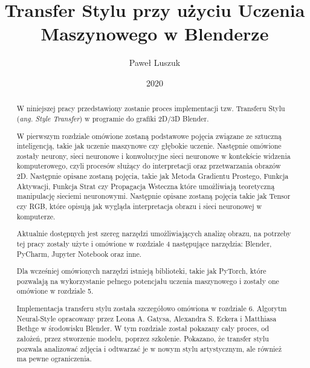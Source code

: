 \documentclass[openright]{xmgr}
\author   {Paweł Luszuk}
\title    {Transfer Stylu przy użyciu Uczenia Maszynowego w Blenderze}
\date     {2020}
\begin{document}
\begin{abstract}

\indent \indent W niniejszej pracy przedstawiony zostanie proces implementacji tzw. Transferu Stylu (\textit{ang. Style Transfer}) w programie do grafiki 2D/3D Blender.

W pierwszym rozdziale omówione zostaną podstawowe pojęcia związane ze sztuczną inteligencją,  takie jak uczenie maszynowe czy głębokie uczenie.  Następnie omówione zostały neurony,  sieci neuronowe i konwolucyjne sieci neuronowe w kontekście widzenia komputerowego,  czyli procesów służący do interpretacji oraz przetwarzania obrazów 2D.  Następnie opisane zostaną pojęcia,  takie jak Metoda Gradientu Prostego,  Funkcja Aktywacji,  Funkcja Strat czy Propagacja Wsteczna które umożliwiają teoretyczną manipulację sieciemi neuronowymi.  Następnie opisane zostaną pojęcia takie jak Tensor czy RGB,  które opisują jak wygląda interpretacja obrazu i sieci neuronowej w komputerze.


Aktualnie dostępnych jest szereg narzędzi umożliwiających analizę obrazu, na potrzeby tej pracy zostały użyte i omówione w rozdziale 4 następujące narzędzia: Blender,  PyCharm,  Jupyter Notebook oraz inne. 

\indent \indent Dla wcześniej omówionych narzędzi istnieją biblioteki, takie jak PyTorch,  które pozwalają na wykorzystanie pełnego potencjału uczenia maszynowego i zostały one omówione w rozdziale 5.

Implementacja transferu stylu została szczegółowo omówiona w rozdziale 6.  Algorytm Neural-Style opracowany przez Leona A. Gatysa,  Alexandra S. Eckera i Matthiasa Bethge w środowisku Blender.  W tym rozdziale został pokazany cały proces,  od założeń,  przez stworzenie modelu,  poprzez szkolenie.  Pokazano,  że transfer stylu pozwala analizować zdjęcia i odtwarzać je w nowym stylu artystycznym, ale również ma pewne ograniczenia. 
\clearpage
\end{abstract}


\maketitle
\end{document}
